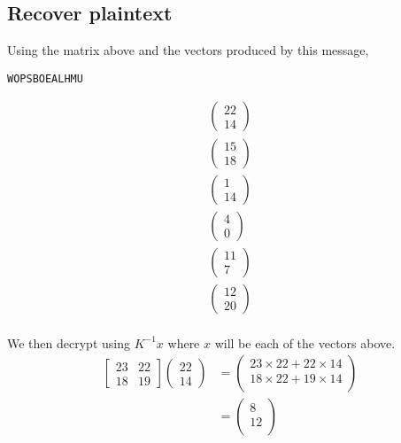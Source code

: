 \documentclass{article}
\begin{document}
\subsection{Recover plaintext}
Using the matrix above and the vectors produced by this message,
\begin{verbatim}
WOPSBOEALHMU
\end{verbatim}
\begin{align*}
    \begin{pmatrix}
        22 \\ 14
    \end{pmatrix} \\
    \begin{pmatrix}
        15 \\ 18
    \end{pmatrix} \\
    \begin{pmatrix}
        1 \\ 14
    \end{pmatrix} \\
    \begin{pmatrix}
        4 \\ 0
    \end{pmatrix} \\
    \begin{pmatrix}
        11 \\ 7
    \end{pmatrix} \\
    \begin{pmatrix}
        12 \\ 20
    \end{pmatrix} \\
\end{align*}

We then decrypt using $K^{-1}x$ where $x$ will be each of the vectors above.
\begin{align*}
    \begin{bmatrix}
        23 & 22 \\
        18 & 19
    \end{bmatrix}
    \begin{pmatrix}
        22 \\ 14
    \end{pmatrix}
    &= 
    \begin{pmatrix}
        23\times22 + 22\times14 \\
        18\times22 + 19\times14 \\
    \end{pmatrix} \\
    &=
    \begin{pmatrix}
        8 \\
        12 \\
    \end{pmatrix} \\
\end{align*}
\end{document}
